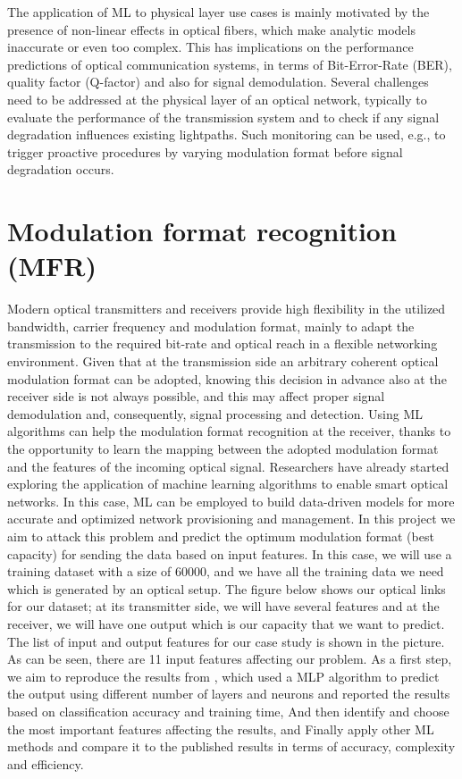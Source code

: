 \documentclass[letterpaper,titlepage,11pt]{article}
\begin{document}
The application of ML to physical layer use cases is mainly motivated by the presence of non-linear effects in optical fibers, which make analytic models inaccurate or even too complex. This has implications on the performance predictions of optical communication systems, in terms of Bit-Error-Rate (BER), quality factor (Q-factor) and also for signal demodulation. Several challenges need to be addressed at the physical layer of an optical network, typically to evaluate the performance of the transmission system and to check if any signal degradation influences existing lightpaths. Such monitoring can be used, e.g., to trigger proactive procedures by varying modulation format before signal degradation occurs.

\section{Modulation format recognition (MFR)}
Modern optical transmitters and receivers provide high flexibility in the utilized bandwidth, carrier frequency and modulation format, mainly to adapt the transmission to the required bit-rate and optical reach in a flexible networking environment. Given that at the transmission side an arbitrary coherent optical modulation format can be adopted, knowing this decision in advance also at the receiver side is not always possible, and this may affect proper signal demodulation and, consequently, signal processing and detection. Using ML algorithms can help the modulation format recognition at the receiver, thanks to the opportunity to learn the mapping between the adopted modulation format and the features of the incoming optical signal. Researchers have already started exploring the application of machine learning algorithms to enable smart optical networks. In this case, ML can be employed to build data-driven models for more accurate and optimized network provisioning and management. In this project we aim to attack this problem and predict the optimum modulation format (best capacity) for sending the data based on input features. In this case, we will use a training dataset with a size of 60000, and we have all the training data we need which is generated by an optical setup. The figure below shows our optical links for our dataset; at its transmitter side, we will have several features and at the receiver, we will have one output which is our capacity that we want to predict. The list of input and output features for our case study is shown in the picture. As can be seen, there are 11 input features affecting our problem. As a first step, we aim to reproduce the results from \citep{rafique2018machine}, which used a MLP algorithm to predict the output using different number of layers and neurons and reported the results based on classification accuracy and training time, And then identify and choose the most important features affecting the results, and Finally apply other ML methods and compare it to the published results in terms of accuracy, complexity and efficiency.
\end{document}
